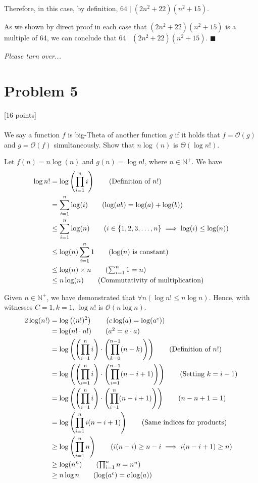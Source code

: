 \documentclass[answers]{exam}
\newcommand{\pt}[1]{\vspace{-0.8em}\textcolor{myDColor}{[#1 points]} \\\\}
\newcommand{\bigo}[1]{\mathcal{O}(#1)}
\renewcommand{\qed}{
   $\blacksquare$\\
}
\newenvironment{colored}[1][]{
    \bgroup\color{#1}
}{
\egroup\vspace{-0.8em}
}
\newenvironment{problem}[1][Problem]{\section*{\textcolor{myLColor}{#1}}}{\vspace{0.2em}}
\renewenvironment{solution}[1][]{\begin{answer}[#1]\begin{colored}[mySolColor]}{\end{colored}\end{answer}\vspace{1em}}
\newcommand{\pto}{
\begin{flushright}
    \textit{\textcolor{myDColor}{Please turn over...}}
\end{flushright}\pagebreak}
\begin{document}
\begin{solution}[by cases]
\begin{mdframed}[backgroundcolor=myLColor!25]
    \noindent Therefore, in this case, by definition, $64 \mid (2n^2 + 22)(n^2 + 15)$.
    \end{mdframed}

    \noindent As we shown by direct proof in each case that $(2n^2 + 22)(n^2 + 15)$ is a multiple of 64, we can conclude that $64 \mid (2n^2 + 22)(n^2 + 15)$.\qed
\end{solution}

\pto

\begin{problem}[Problem 5]
    \pt{16} We say a function $f$ is big-Theta of another function $g$ if it holds that $f = \bigo{g}$ and $g = \bigo{f}$ simultaneously. Show that $n\log(n)$ is $\Theta(\log n!)$.
\end{problem}

\begin{solution}[by witnesses]
    \noindent Let $f(n) = n \log (n)$ and $g(n) = \log n!$, where $n \in \mathbb{N}^{+}$. We have \begin{align}
        \log n! &= \log \left(\prod_{i = 1}^n i\right) \tag{Definition of $n!$}\\
        &= \sum_{i = 1}^n \log(i) \tag{$\log(ab) = \log(a) + \log(b)$}\\
        &\le \sum_{i = 1}^n \log(n) \tag{$i \in \{1, 2, 3, \ldots, n\} \implies \log(i) \le \log(n)$}\\
        &\le \log(n) \sum_{i = 1}^n 1 \tag{$\log(n)$ is constant}\\
        &\le \log(n) \times n \tag{$\sum_{i = 1}^n 1 = n$}\\
        &\le n\log(n) \tag{Commutativity of multiplication}
    \end{align}

    \noindent Given $n \in \mathbb{N}^{+}$, we have demonstrated that $\forall n (\log n! \le n\log n)$. Hence, with witnesses $C = 1, k = 1$, $\log n!$ is $\bigo{n \log n}$.
    \begin{align*}
        2\log(n!) &= \log\left((n!)^2\right) \tag{$c\log(a) = \log(a^c)$}\\
        &= \log(n! \cdot n!) \tag{$a^2 = a \cdot a$}\\
        &= \log \left(\left(\prod_{i = 1}^n i\right) \cdot \left(\prod_{k = 0}^{n - 1} (n - k)\right)\right) \tag{Definition of $n!$}\\
        &= \log \left(\left(\prod_{i = 1}^n i\right) \cdot \left(\prod_{i = 1}^{n - 1} (n - i + 1)\right)\right) \tag{Setting $k = i - 1$}\\
        &= \log \left(\left(\prod_{i = 1}^n i\right) \cdot \left(\prod_{i = 1}^{n} (n - i + 1)\right)\right) \tag{$n - n + 1 = 1$}\\
        &= \log \left(\prod_{i = 1}^n i(n - i + 1)\right) \tag{Same indices for products}\\
        &\ge \log \left(\prod_{i = 1}^n n\right) \tag{$i(n - i) \ge n - i \implies i(n - i + 1) \ge n$}\\
        &\ge \log (n^n) \tag{$\prod_{i = 1}^n n = n^n$}\\
        &\ge n \log n \tag{$\log(a^c)= c\log(a)$}
    \end{align*}


\end{solution}
\end{document}
